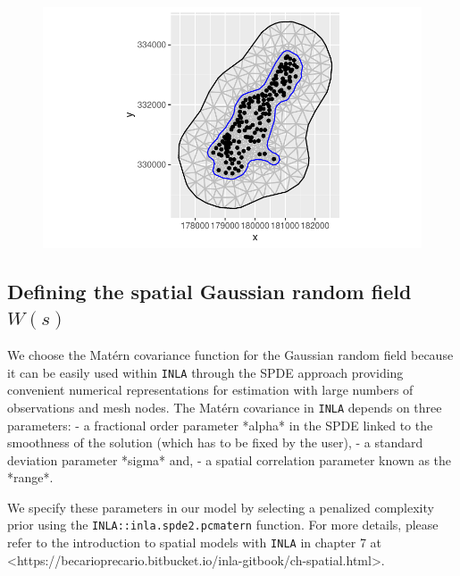 \documentclass[
  a4paper,
]{article}
\begin{document}
\begin{figure}[H]

{\centering \includegraphics{pedometron_files/figure-pdf/unnamed-chunk-4-1.pdf}

}

\end{figure}

\hypertarget{defining-the-spatial-gaussian-random-field-ws}{%
\subsection{\texorpdfstring{Defining the spatial Gaussian random field
\(W(s)\)}{Defining the spatial Gaussian random field W(s)}}\label{defining-the-spatial-gaussian-random-field-ws}}

We choose the Matérn covariance function for the Gaussian random field
because it can be easily used within \texttt{INLA} through the SPDE
approach providing convenient numerical representations for estimation
with large numbers of observations and mesh nodes. The Matérn covariance
in \texttt{INLA} depends on three parameters: - a fractional order
parameter *alpha* in the SPDE linked to the smoothness of the solution
(which has to be fixed by the user), - a standard deviation parameter
*sigma* and, - a spatial correlation parameter known as the *range*.

We specify these parameters in our model by selecting a penalized
complexity prior using the \texttt{INLA::inla.spde2.pcmatern} function.
For more details, please refer to the introduction to spatial models
with \texttt{INLA} in chapter 7 at
\textless https://becarioprecario.bitbucket.io/inla-gitbook/ch-spatial.html\textgreater.
\end{document}
